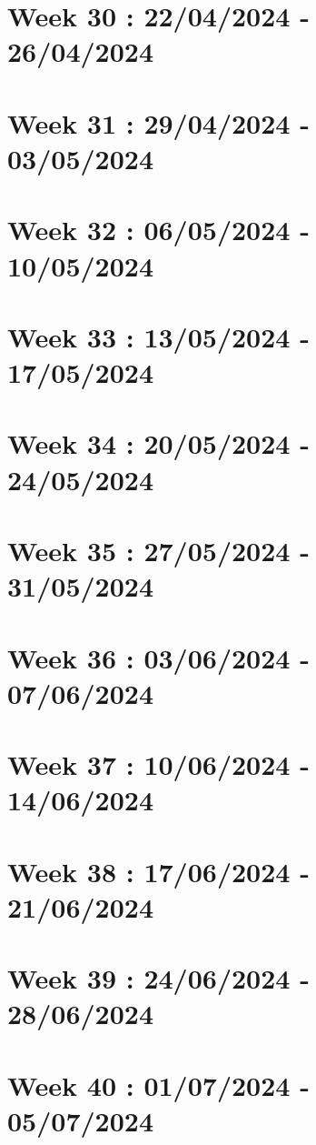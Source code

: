 \documentclass[french]{article}
\begin{document}
	\section{Week 30 : 22/04/2024 - 26/04/2024}
	

	\section{Week 31 : 29/04/2024 - 03/05/2024}
	

	\section{Week 32 : 06/05/2024 - 10/05/2024}
	

	\section{Week 33 : 13/05/2024 - 17/05/2024}
	

	\section{Week 34 : 20/05/2024 - 24/05/2024}
	

	\section{Week 35 : 27/05/2024 - 31/05/2024}
	

	\section{Week 36 : 03/06/2024 - 07/06/2024}
	

	\section{Week 37 : 10/06/2024 - 14/06/2024}
	

	\section{Week 38 : 17/06/2024 - 21/06/2024}
	

	\section{Week 39 : 24/06/2024 - 28/06/2024}
	

	\section{Week 40 : 01/07/2024 - 05/07/2024}
	
\end{document}
